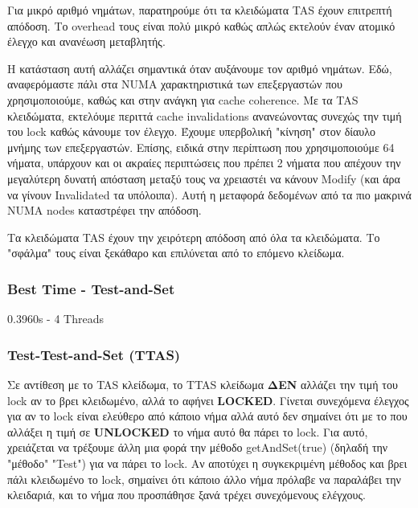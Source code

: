 \documentclass[../final_report.tex]{subfiles}
\begin{document}
Για μικρό αριθμό νημάτων, παρατηρούμε ότι τα κλειδώματα TAS έχουν επιτρεπτή απόδοση.
Το overhead τους είναι πολύ μικρό καθώς απλώς εκτελούν έναν ατομικό έλεγχο και ανανέωση
μεταβλητής.

Η κατάσταση αυτή αλλάζει σημαντικά όταν αυξάνουμε τον αριθμό νημάτων. Εδώ, αναφερόμαστε πάλι
στα NUMA χαρακτηριστικά των επεξεργαστών που χρησιμοποιούμε, καθώς και στην ανάγκη για cache
coherence. Με τα TAS κλειδώματα, εκτελόυμε περιττά
cache invalidations ανανεώνοντας συνεχώς την τιμή του lock καθώς κάνουμε τον έλεγχο. Έχουμε 
υπερβολική "κίνηση" στον δίαυλο μνήμης των επεξεργαστών. Επίσης, ειδικά στην περίπτωση που 
χρησιμοποιούμε 64 νήματα, υπάρχουν και οι ακραίες περιπτώσεις που πρέπει 2 νήματα που απέχουν
την μεγαλύτερη δυνατή απόσταση μεταξύ τους να χρειαστέι να κάνουν Modify (και άρα να γίνουν Invalidated
τα υπόλοιπα). Αυτή η μεταφορά δεδομένων από τα πιο μακρινά NUMA nodes καταστρέφει την απόδοση.

Τα κλειδώματα TAS έχουν την χειρότερη απόδοση από όλα τα κλειδώματα. Το "σφάλμα" τους είναι 
ξεκάθαρο και επιλύνεται από το επόμενο κλείδωμα.

\subsubsection*{Best Time - Test-and-Set}
0.3960s - 4 Threads


\subsubsection{Test-Test-and-Set (TTAS)}

Σε αντίθεση με το TAS κλείδωμα, το TTAS κλείδωμα \textbf{ΔΕΝ} αλλάζει την τιμή του lock αν το βρει
κλειδωμένο, αλλά το αφήνει \textbf{LOCKED}. Γίνεται συνεχόμενα έλεγχος για αν το lock είναι ελεύθερο
από κάποιο νήμα αλλά αυτό δεν σημαίνει ότι με το που αλλάξει η τιμή σε \textbf{UNLOCKED} το νήμα
αυτό θα πάρει το lock. Για αυτό, χρειάζεται να τρέξουμε άλλη μια φορά την μέθοδο getAndSet(true) (δηλαδή την
"μέθοδο" "Test") για να πάρει το lock. Αν αποτύχει η συγκεκριμένη μέθοδος και βρει πάλι κλειδωμένο το lock, σημαίνει ότι
κάποιο άλλο νήμα πρόλαβε να παραλάβει την κλειδαριά, και το νήμα που προσπάθησε ξανά τρέχει συνεχόμενους 
ελέγχους.
\end{document}
